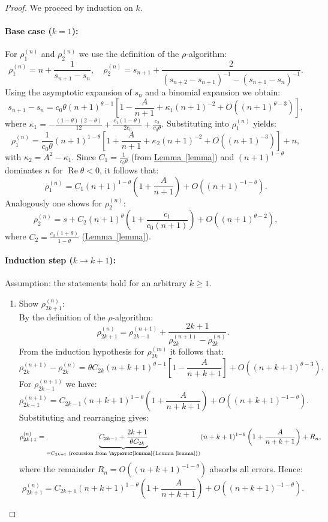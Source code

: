 \documentclass[a4paper,12pt]{article}
\numberwithin{equation}{section}
\newcommand{\lemref}[1]{\hyperref[#1]{Lemma~\ref*{#1}}}
\theoremstyle{remark}
\begin{document}
\begin{proof}
We proceed by induction on \(k\).

\paragraph{Base case (\(k = 1\)):}
For \(\rho_1^{(n)}\) and \(\rho_2^{(n)}\) we use the definition of the \(\rho\)-algorithm:
\[
\rho_1^{(n)} = n + \frac{1}{s_{n+1} - s_n}, \quad
\rho_2^{(n)} = s_{n+1} + \frac{2}{(s_{n+2} - s_{n+1})^{-1} - (s_{n+1} - s_n)^{-1}}.
\]
Using the asymptotic expansion of \(s_n\) and a binomial expansion we obtain:
\[
s_{n+1} - s_n = c_0 \theta (n + 1)^{\theta - 1} \left[ 1 - \frac{A}{n + 1} + \kappa_1 (n + 1)^{-2} + O\left( (n + 1)^{\theta - 3} \right) \right],
\]
where \(\kappa_1 = -\frac{(1 - \theta)(2 - \theta)}{12} + \frac{c_1 (1 - \theta)}{2c_0} + \frac{c_2}{c_0 \theta}\). Substituting into \(\rho_1^{(n)}\) yields:
\[
\rho_1^{(n)} = \frac{1}{c_0 \theta} (n + 1)^{1 - \theta} \left[ 1 + \frac{A}{n + 1} + \kappa_2 (n + 1)^{-2} + O\left( (n + 1)^{-3} \right) \right] + n,
\]
with \(\kappa_2 = A^2 - \kappa_1\). Since \(C_1 = \frac{1}{c_0 \theta}\) (from \lemref{lemma}) and \((n + 1)^{1 - \theta}\) dominates \(n\) for \(\operatorname{Re} \theta < 0\), it follows that:
\[
\rho_1^{(n)} = C_1 (n + 1)^{1 - \theta} \left( 1 + \frac{A}{n + 1} \right) + O\left( (n + 1)^{-1 - \theta} \right).
\]
Analogously one shows for \(\rho_2^{(n)}\):
\[
\rho_2^{(n)} = s + C_2 (n + 1)^{\theta} \left( 1 + \frac{c_1}{c_0 (n + 1)} \right) + O\left( (n + 1)^{\theta - 2} \right),
\]
where \(C_2 = \frac{c_0 (1 + \theta)}{1 - \theta}\) (\lemref{lemma}).

\paragraph{Induction step (\(k \to k + 1\)):}
Assumption: the statements hold for an arbitrary \(k \geq 1\).

\begin{enumerate}
\item {Show \(\rho_{2k+1}^{(n)}\):} \\
By the definition of the \(\rho\)-algorithm:
\[
\rho_{2k+1}^{(n)} = \rho_{2k-1}^{(n+1)} + \frac{2k + 1}{\rho_{2k}^{(n+1)} - \rho_{2k}^{(n)}}.
\]
From the induction hypothesis for \(\rho_{2k}^{(m)}\) it follows that:
\[
\rho_{2k}^{(n+1)} - \rho_{2k}^{(n)} = \theta C_{2k} (n + k + 1)^{\theta - 1} \left[ 1 - \frac{A}{n + k + 1} \right] + O\left( (n + k + 1)^{\theta - 3} \right).
\]
For \(\rho_{2k-1}^{(n+1)}\) we have:
\[
\rho_{2k-1}^{(n+1)} = C_{2k-1} (n + k + 1)^{1 - \theta} \left( 1 + \frac{A}{n + k + 1} \right) + O\left( (n + k + 1)^{-1 - \theta} \right).
\]
Substituting and rearranging gives:
\[
\rho_{2k+1}^{(n)} = \underbrace{C_{2k-1} + \frac{2k + 1}{\theta C_{2k}}}_{= C_{2k+1} \text{ (recursion from \lemref{lemma})}} (n + k + 1)^{1 - \theta} \left( 1 + \frac{A}{n + k + 1} \right) + R_n,
\]
where the remainder \(R_n = O\left( (n + k + 1)^{-1 - \theta} \right)\) absorbs all errors. Hence:
\[
\rho_{2k+1}^{(n)} = C_{2k+1} (n + k + 1)^{1 - \theta} \left( 1 + \frac{A}{n + k + 1} \right) + O\left( (n + k + 1)^{-1 - \theta} \right).
\]


\end{enumerate}
\end{proof}
\end{document}
